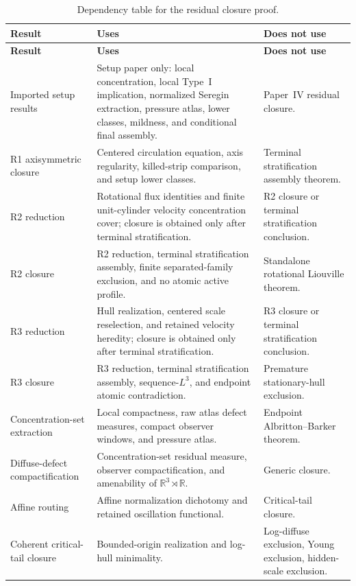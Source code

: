 \documentclass[11pt]{amsart}
\numberwithin{equation}{section}
\theoremstyle{plain}
\theoremstyle{definition}
\theoremstyle{remark}
\begin{document}
\begin{longtable}{@{}L{0.24\textwidth}L{0.45\textwidth}L{0.23\textwidth}@{}}
\caption{Dependency table for the residual closure proof.}
\label{tab:paperIV-dependency-order}\\
\hline
\textbf{Result} & \textbf{Uses} & \textbf{Does not use}\\
\hline
\endfirsthead
\hline
\textbf{Result} & \textbf{Uses} & \textbf{Does not use}\\
\hline
\endhead
\hline
\endfoot
Imported setup results &
Setup paper only: local concentration, local Type~I implication, normalized
Seregin extraction, pressure atlas, lower classes, mildness, and conditional
final assembly. &
Paper~IV residual closure.\\
R1 axisymmetric closure &
Centered circulation equation, axis regularity, killed-strip comparison, and
setup lower classes. &
Terminal stratification assembly theorem.\\
R2 reduction &
Rotational flux identities and finite unit-cylinder velocity concentration
cover; closure is obtained only after terminal stratification. &
R2 closure or terminal stratification conclusion.\\
R2 closure &
R2 reduction, terminal stratification assembly, finite separated-family exclusion,
and no atomic active profile. &
Standalone rotational Liouville theorem.\\
R3 reduction &
Hull realization, centered scale reselection, and retained velocity heredity;
closure is obtained only after terminal stratification. &
R3 closure or terminal stratification conclusion.\\
R3 closure &
R3 reduction, terminal stratification assembly, sequence-\(L^3\), and endpoint
atomic contradiction. &
Premature stationary-hull exclusion.\\
Concentration-set extraction &
Local compactness, raw atlas defect measures, compact observer windows, and pressure
atlas. &
Endpoint Albritton--Barker theorem.\\
Diffuse-defect compactification &
Concentration-set residual measure, observer compactification, and amenability of
\(\mathbb R^3\rtimes\mathbb R\). &
Generic closure.\\
Affine routing &
Affine normalization dichotomy and retained oscillation functional. &
Critical-tail closure.\\
Coherent critical-tail closure &
Bounded-origin realization and log-hull minimality. &
Log-diffuse exclusion, Young exclusion, hidden-scale exclusion.\\

\end{longtable}
\end{document}
